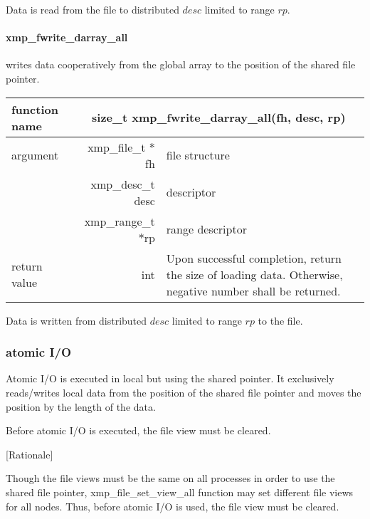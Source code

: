    Data is read from the file to distributed $desc$ limited to range $rp$.

   \paragraph{ xmp\_fwrite\_darray\_all} writes data cooperatively from the global array to the
   position of the shared file pointer.

   \begin{table}[h]
    \begin{center}
     \begin{tabular}{|l|r|p{80mm}|}
      \hline
      {\bf function name}  & \multicolumn{2}{c|}{\bf size\_t
      xmp\_fwrite\_darray\_all(fh, desc, rp)} \\ \hline \hline
      argument & xmp\_file\_t $*$fh & file structure \\ \cline{2-3}
      & xmp\_desc\_t desc & descriptor \\ \cline{2-3}
      & xmp\_range\_t $*$rp & range descriptor \\ \hline
      return value & int & Upon successful completion, return the size
	      of loading data. Otherwise, negative number shall be
	      returned. \\ \hline
      \end{tabular}
     \end{center}
    \label{tb:aaa}
   \end{table}

   Data is written from distributed $desc$ limited to range $rp$ to the file.

   \clearpage

   \subsubsection{atomic I/O}

   Atomic I/O is executed in local but using the shared pointer. 
   It exclusively reads/writes local data
   from the position of the shared file pointer and moves the position by the length of the data.

   Before atomic I/O is executed, the file view must be cleared.
   
   [Rationale]

   Though the file views must be the same on all processes in order to use the shared file pointer,
   xmp\_file\_set\_view\_all
   function may set different file views for all nodes.
   Thus, before atomic I/O is used, the file view must be cleared.


